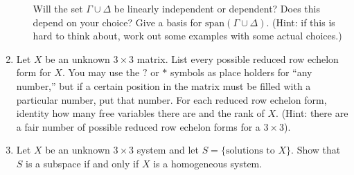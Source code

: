 \documentclass[letter]{article}
\newcommand{\Span}{\mathrm{span}}
\begin{document}
\begin{enumerate}
\begin{enumerate}
					Will the set $\Gamma\cup \Delta$ be linearly independent or dependent?
					Does this depend on your choice?  Give a basis for $\Span(\Gamma\cup\Delta)$.
					(Hint: if this is hard to think about, work out some examples with some actual
					choices.)
			\end{enumerate}
		\item Let $X$ be an unknown $3\times 3$ matrix.  List every possible reduced row echelon form
			for $X$.  You may use the $?$ or $*$ symbols as place holders for ``any number,'' but
			if a certain position in the matrix must be filled with a particular number, put that number.
			For each reduced row echelon form, identity how many free variables there are and the rank
			of $X$.  (Hint: there
			are a fair number of possible reduced row echelon forms for a $3\times 3$).
		\item Let $X$ be an unknown $3\times 3$ system and let $S=\{\text{solutions to }X\}$.
			Show that $S$ is a subspace if and only if $X$ is a homogeneous system.
		
	\end{enumerate}
\end{document}
